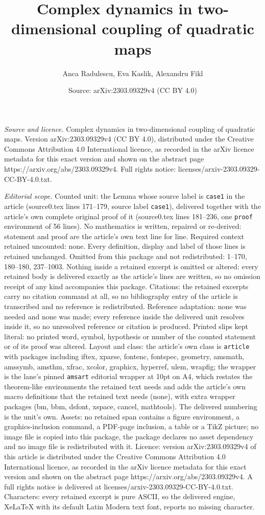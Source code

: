 \documentclass[10pt,a4paper]{amsart}
\title[Complex dynamics in two-dimensional coupling of quadratic ma]{Complex dynamics in two-dimensional coupling of quadratic maps}
\author{Anca Radulescu, Eva Kaslik, Alexandru Fikl}
\date{Source: arXiv:2303.09329v4 (CC BY 4.0)}
\begin{document}
\maketitle

\noindent\emph{Source and licence.} Complex dynamics in two-dimensional coupling of quadratic maps. Version arXiv:2303.09329v4 (CC BY 4.0), distributed under the Creative Commons Attribution 4.0 International licence, as recorded in the arXiv licence metadata for this exact version and shown on the abstract page https://arxiv.org/abs/2303.09329v4. Full rights notice: licenses/arxiv-2303.09329-CC-BY-4.0.txt.\par\smallskip

\noindent\textit{Editorial scope.} Counted unit: the Lemma whose source label is \texttt{case1} in the article (source0.tex lines 171--179, source label \texttt{case1}), delivered together with the article's own complete original proof of it (source0.tex lines 181--236, one \texttt{proof} environment of 56 lines). No mathematics is written, repaired or re-derived: statement and proof are the article's own text line for line. Required context retained uncounted: none. Every definition, display and label of those lines is retained unchanged. Omitted from this package and not redistributed: 1--170, 180--180, 237--1003. Nothing inside a retained excerpt is omitted or altered: every retained body is delivered exactly as the article's lines are written, so no omission receipt of any kind accompanies this package. Citations: the retained excerpts carry no citation command at all, so no bibliography entry of the article is transcribed and no reference is redistributed. Reference adaptation: none was needed and none was made; every reference inside the delivered unit resolves inside it, so no unresolved reference or citation is produced. Printed slips kept literal: no printed word, symbol, hypothesis or number of the counted statement or of its proof was altered. Layout and class: the article's own class is \texttt{article} with packages including iftex, xparse, fontenc, fontspec, geometry, amsmath, amssymb, amsthm, xfrac, xcolor, graphicx, hyperref, ulem, wrapfig; the wrapper is the lane's pinned \texttt{amsart} editorial wrapper at 10pt on A4, which restates the theorem-like environments the retained text needs and adds the article's own macro definitions that the retained text needs (none), with extra wrapper packages (bm, bbm, dsfont, xspace, cancel, mathtools). The delivered numbering is the unit's own. Assets: no retained span contains a figure environment, a graphics-inclusion command, a PDF-page inclusion, a table or a TikZ picture; no image file is copied into this package, the package declares no asset dependency and no image file is redistributed with it. Licence: version arXiv:2303.09329v4 of this article is distributed under the Creative Commons Attribution 4.0 International licence, as recorded in the arXiv licence metadata for this exact version and shown on the abstract page https://arxiv.org/abs/2303.09329v4. A full rights notice is delivered at licenses/arxiv-2303.09329-CC-BY-4.0.txt. Characters: every retained excerpt is pure ASCII, so the delivered engine, XeLaTeX with its default Latin Modern text font, reports no missing character.
\end{document}
